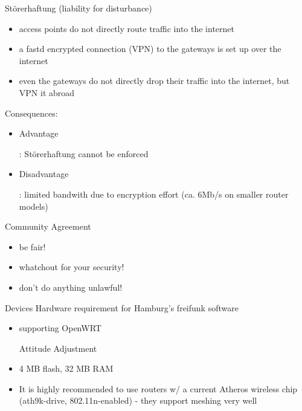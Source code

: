 \documentclass[c]{beamer}
\begin{document}
\begin{frame}{Störerhaftung (liability for disturbance)}
	\begin{itemize}
		\item access points do not directly route traffic into the internet
		\item a fastd encrypted connection (VPN) to the gateways is set up over the internet
		\item even the gateways do not directly drop their traffic into the internet, but VPN it abroad
	\end{itemize}
	Consequences:
	\begin{itemize}
		\item \begin{it}Advantage\end{it}: Störerhaftung cannot be enforced
		\item \begin{it}Disadvantage\end{it}: limited bandwith due to encryption effort (ca. 6Mb/s on smaller router models)
	\end{itemize}
\end{frame}


\begin{frame}{Community Agreement}
	\begin{itemize}
		\item be fair!
		\item whatchout for your security!
		\item don't do anything unlawful!
	\end{itemize}
\end{frame}


\begin{frame}{Devices}
	Hardware requirement for Hamburg's freifunk software
	\begin{itemize}
		\item supporting OpenWRT \begin{it}Attitude Adjustment\end{it}
		\item 4 MB flash, 32 MB RAM
		\item It is highly recommended to use routers w/ a current Atheros wireless chip (ath9k-drive, 802.11n-enabled) - they support meshing very well
	\end{itemize}
\end{frame}
\end{document}
